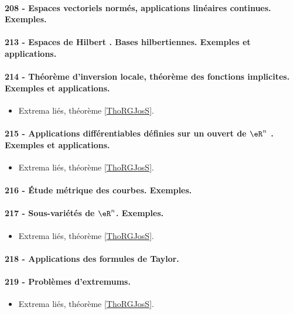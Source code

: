 \paragraph{208 - Espaces vectoriels normés, applications linéaires continues. Exemples.}
\paragraph{213 - Espaces de Hilbert . Bases hilbertiennes. Exemples et applications.}
\paragraph{214 - Théorème d’inversion locale, théorème des fonctions implicites. Exemples et applications.}
\begin{itemize}
    \item Extrema liés, théorème \ref{ThoRGJosS}.
\end{itemize}
\paragraph{215 - Applications différentiables définies sur un ouvert de $\eR^n$ . Exemples et applications.}
\begin{itemize}
    \item Extrema liés, théorème \ref{ThoRGJosS}.
\end{itemize}
\paragraph{216 - Étude métrique des courbes. Exemples.}
\paragraph{217 - Sous-variétés de \( \eR^n\). Exemples.}
\begin{itemize}
    \item Extrema liés, théorème \ref{ThoRGJosS}.
\end{itemize}
\paragraph{218 - Applications des formules de Taylor.}
\paragraph{219 - Problèmes d’extremums.}
\begin{itemize}
    \item Extrema liés, théorème \ref{ThoRGJosS}.
\end{itemize}
